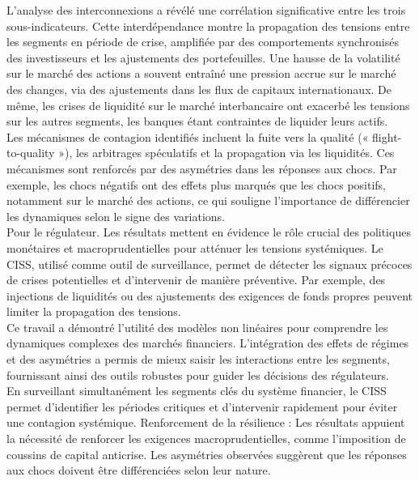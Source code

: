L’analyse des interconnexions a révélé une corrélation significative entre les trois sous-indicateurs. Cette interdépendance montre la propagation des tensions entre les segments en période de crise, amplifiée par des comportements synchronisés des investisseurs et les ajustements des portefeuilles. Une hausse de la volatilité sur le marché des actions a souvent entraîné une pression accrue sur le marché des changes, via des ajustements dans les flux de capitaux internationaux. De même, les crises de liquidité sur le marché interbancaire ont exacerbé les tensions sur les autres segments, les banques étant contraintes de liquider leurs actifs.\\

Les mécanismes de contagion identifiés incluent la fuite vers la qualité (« flight-to-quality »), les arbitrages spéculatifs et la propagation via les liquidités. Ces mécanismes sont renforcés par des asymétries dans les réponses aux chocs. Par exemple, les chocs négatifs ont des effets plus marqués que les chocs positifs, notamment sur le marché des actions, ce qui souligne l'importance de différencier les dynamiques selon le signe des variations.\\

Pour le régulateur. Les résultats mettent en évidence le rôle crucial des politiques monétaires et macroprudentielles pour atténuer les tensions systémiques. Le CISS, utilisé comme outil de surveillance, permet de détecter les signaux précoces de crises potentielles et d’intervenir de manière préventive. Par exemple, des injections de liquidités ou des ajustements des exigences de fonds propres peuvent limiter la propagation des tensions.\\

Ce travail a démontré l’utilité des modèles non linéaires pour comprendre les dynamiques complexes des marchés financiers. L’intégration des effets de régimes et des asymétries a permis de mieux saisir les interactions entre les segments, fournissant ainsi des outils robustes pour guider les décisions des régulateurs.\\

En surveillant simultanément les segments clés du système financier, le CISS permet d’identifier les périodes critiques et d’intervenir rapidement pour éviter une contagion systémique.
Renforcement de la résilience : Les résultats appuient la nécessité de renforcer les exigences macroprudentielles, comme l’imposition de coussins de capital anticrise. Les asymétries observées suggèrent que les réponses aux chocs doivent être différenciées selon leur nature. \\

